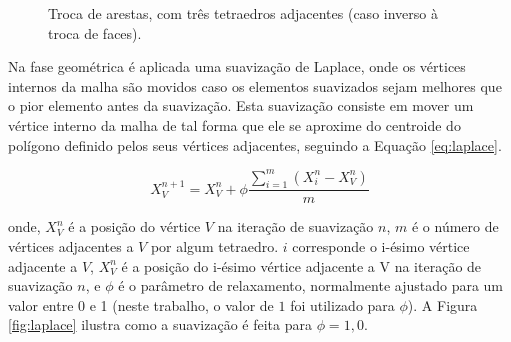 \begin{figure}[!ht]
	
	\centering
	\qquad	
	\caption{Troca de arestas, com três tetraedros adjacentes (caso inverso à troca de faces).}	
	\label{fig:edge_swapping}
	
\end{figure}


Na fase geométrica é aplicada uma suavização de Laplace, onde os vértices internos da malha são movidos caso os elementos suavizados sejam melhores que o pior elemento antes da suavização. Esta suavização consiste em mover um vértice interno da malha de tal forma que ele se aproxime do centroide do polígono definido pelos seus vértices adjacentes, seguindo a Equação \ref{eq:laplace}. 


\begin{equation}
X_V^{n+1} = X_V^{n} + \phi \frac{\sum_{i=1}^m (X_i^n - X_V^n)}{m}
\label{eq:laplace}
\end{equation}

\noindent
onde, $X_V^{n}$ é a posição do vértice $V$ na iteração de suavização $n$, $m$ é o número de vértices adjacentes a $V$ por algum tetraedro. $i$ corresponde o i-ésimo vértice adjacente a $V$, $X_V^{n}$ é a posição do i-ésimo vértice adjacente a V na iteração de suavização $n$, e $\phi$ é o parâmetro de relaxamento, normalmente ajustado para um valor entre 0 e 1 (neste trabalho, o valor de $1$ foi utilizado para $\phi$). A Figura \ref{fig:laplace} ilustra como a suavização é feita para $\phi=1,0$.



